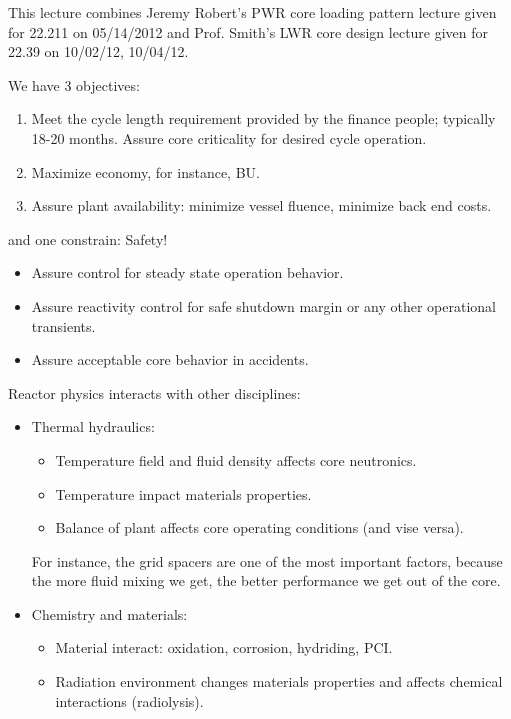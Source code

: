 \documentclass{school-22.211-notes}
\date{May 14, 2012}
\begin{document}
\maketitle

This lecture combines Jeremy Robert's PWR core loading pattern lecture given for 22.211 on 05/14/2012 and Prof. Smith's LWR core design lecture given for 22.39 on 10/02/12, 10/04/12. 

We have 3 objectives:
\begin{enumerate}
\item Meet the cycle length requirement provided by the finance people; typically 18-20 months. Assure core criticality for desired cycle operation. 
\item Maximize economy, for instance, BU. 
\item Assure plant availability: minimize vessel fluence, minimize back end costs. 
\end{enumerate}
and one constrain: Safety!
  \begin{itemize}
    \item Assure control for steady state operation behavior. 
    \item Assure reactivity control for safe shutdown margin or any other operational transients. 
    \item Assure acceptable core behavior in accidents. 
  \end{itemize}
Reactor physics interacts with other disciplines: 
\begin{itemize}
\item Thermal hydraulics: 
  \begin{itemize}
  \item Temperature field and fluid density affects core neutronics. 
  \item Temperature impact materials properties. 
  \item Balance of plant affects core operating conditions (and vise versa). 
  \end{itemize}
  For instance, the grid spacers are one of the most important factors, because the more fluid mixing we get, the better performance we get out of the core. 

\item Chemistry and materials: 
  \begin{itemize}
    \item Material interact: oxidation, corrosion, hydriding, PCI.
    \item Radiation environment changes materials properties and affects chemical interactions (radiolysis). 
  \end{itemize}
\end{itemize}
\end{document}

